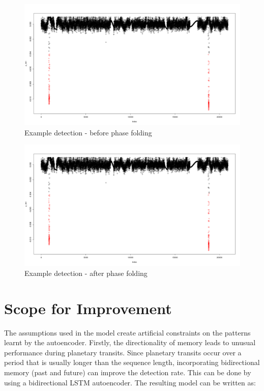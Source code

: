 \documentclass[%
aip,
amsmath,amssymb,
reprint,%
]{revtex4-1}
\begin{document}
\begin{figure}[h!]
	\includegraphics[width=\linewidth]{eg2_before.png}
	\caption{Example detection - before phase folding}
	\label{fig:eg2_before}
\end{figure}

\begin{figure}[h!]
	\includegraphics[width=\linewidth]{eg2_after.png}
	\caption{Example detection - after phase folding}
	\label{fig:eg2_after}
\end{figure}

\section{Scope for Improvement}

The assumptions used in the model create artificial constraints on the patterns learnt by the autoencoder. Firstly, the directionality of memory leads to unusual performance during planetary transits. Since planetary transits occur over a period that is usually longer than the sequence length, incorporating bidirectional memory (past and future) can improve the detection rate. This can be done by using a bidirectional LSTM autoencoder. The resulting model can be written as:
\end{document}
